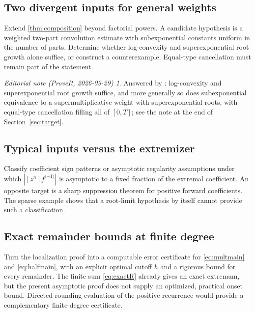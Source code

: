 \documentclass[11pt,a4paper]{article}
\theoremstyle{definition}
\theoremstyle{remark}
\newtheorem*{ednote}{Editorial note (ProveIt, 2026-09-29)}
\newcommand{\inv}{^{\langle-1\rangle}}
\numberwithin{equation}{section}
\begin{document}
\subsection{Two divergent inputs for general weights}
Extend \cref{thm:composition} beyond factorial powers. A candidate
hypothesis is a weighted two-part convolution estimate with
subexponential constants uniform in the number of parts. Determine
whether log-convexity and superexponential root growth alone suffice,
or construct a counterexample. Equal-type cancellation must remain
part of the statement.
\begin{ednote}
Answered by : log-convexity
and superexponential root growth suffice, and more generally so does
subexponential equivalence to a supermultiplicative weight with
superexponential roots, with equal-type cancellation filling all of
$[0,T]$; see the note at the end of Section~\ref{sec:target}.
\end{ednote}

\subsection{Typical inputs versus the extremizer}
Classify coefficient sign patterns or asymptotic regularity assumptions
under which $|[z^n]f\inv|$ is asymptotic to a fixed fraction of the
extremal coefficient. An opposite target is a sharp suppression theorem
for positive forward coefficients. The sparse example shows that a
root-limit hypothesis by itself cannot provide such a classification.

\subsection{Exact remainder bounds at finite degree}
Turn the localization proof into a computable error certificate for
\eqref{eq:multmain} and \eqref{eq:halfmain}, with an explicit optimal
cutoff $h$ and a rigorous bound for every remainder. The finite sum
\eqref{eq:exactR} already gives an exact extremum, but the present
asymptotic proof does not supply an optimized, practical onset bound.
Directed-rounding evaluation of the positive recurrence would provide
a complementary finite-degree certificate.
\end{document}
